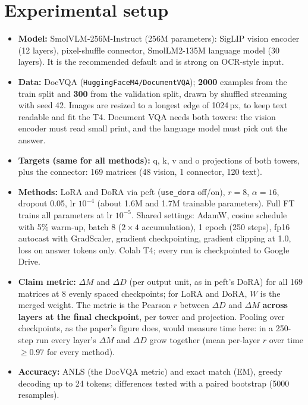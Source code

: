 \documentclass[10pt,a4paper]{article}
\newcommand{\dM}{\Delta M}
\newcommand{\dD}{\Delta D}
\newcommand{\code}[1]{\texttt{#1}}
\begin{document}
\section{Experimental setup}
\begin{itemize}
  \item \textbf{Model:} SmolVLM-256M-Instruct (256M parameters): SigLIP vision encoder (12 layers), pixel-shuffle connector, SmolLM2-135M language model (30 layers).
        It is the recommended default and is strong on OCR-style input.
  \item \textbf{Data:} DocVQA (\code{HuggingFaceM4/DocumentVQA}); \textbf{2000} examples from the train split and \textbf{300} from the validation split, drawn by shuffled streaming with seed 42.
        Images are resized to a longest edge of 1024\,px, to keep text readable and fit the T4.
        Document VQA needs both towers: the vision encoder must read small print, and the language model must pick out the answer.
  \item \textbf{Targets (same for all methods):} q, k, v and o projections of both towers, plus the connector: 169 matrices (48 vision, 1 connector, 120 text).
  \item \textbf{Methods:} LoRA and DoRA via peft (\code{use\_dora} off/on), $r=8$, $\alpha=16$, dropout 0.05, lr $10^{-4}$ (about 1.6M and 1.7M trainable parameters).
        Full FT trains all parameters at lr $10^{-5}$.
        Shared settings: AdamW, cosine schedule with 5\% warm-up, batch 8 ($2\times4$ accumulation), 1 epoch (250 steps), fp16 autocast with GradScaler, gradient checkpointing, gradient clipping at 1.0, loss on answer tokens only.
        Colab T4; every run is checkpointed to Google Drive.
  \item \textbf{Claim metric:} $\dM$ and $\dD$ (per output unit, as in peft's DoRA) for all 169 matrices at 8 evenly spaced checkpoints; for LoRA and DoRA, $W$ is the merged weight.
        The metric is the Pearson $r$ between $\dD$ and $\dM$ \textbf{across layers at the final checkpoint}, per tower and projection.
        Pooling over checkpoints, as the paper's figure does, would measure time here: in a 250-step run every layer's $\dM$ and $\dD$ grow together (mean per-layer $r$ over time $\geq 0.97$ for every method).
  \item \textbf{Accuracy:} ANLS (the DocVQA metric) and exact match (EM), greedy decoding up to 24 tokens; differences tested with a paired bootstrap (5000 resamples).
\end{itemize}
\end{document}
